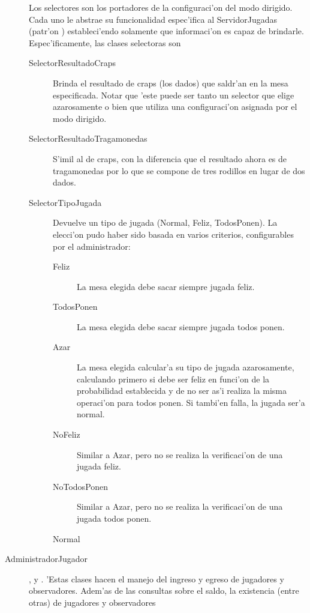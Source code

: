\begin{description}
\item[] Los selectores son los portadores de la configuraci'on del modo dirigido. Cada uno le abstrae su funcionalidad espec'ifica al ServidorJugadas (patr'on ) estableci'endo solamente que informaci'on es capaz de brindarle. Espec'ificamente, las clases selectoras son
	\begin{description}
	\item[SelectorResultadoCraps] Brinda el resultado de craps (los dados) que saldr'an en la mesa especificada. Notar que 'este puede ser tanto un selector que elige azarosamente o bien que utiliza una configuraci'on asignada por el modo dirigido.
	\item[SelectorResultadoTragamonedas] S'imil al de craps, con la diferencia que el resultado ahora es de tragamonedas por lo que se compone de tres rodillos en lugar de dos dados.
	\item[SelectorTipoJugada] Devuelve un tipo de jugada (Normal, Feliz, TodosPonen). La elecci'on pudo haber sido basada en varios criterios, configurables por el administrador:
		\begin{description}
			\item[Feliz] La mesa elegida debe sacar siempre jugada feliz.
			\item[TodosPonen] La mesa elegida debe sacar siempre jugada todos ponen.
			\item[Azar] La mesa elegida calcular'a su tipo de jugada azarosamente, calculando primero si debe ser feliz en funci'on de la probabilidad establecida y de no ser as'i realiza la misma operaci'on para todos ponen. Si tambi'en falla, la jugada ser'a normal.
			\item[NoFeliz] Similar a Azar, pero no se realiza la verificaci'on de una jugada feliz.
			\item[NoTodosPonen] Similar a Azar, pero no se realiza la verificaci'on de una jugada todos ponen.
			\item[Normal] 
		\end{description} 
	\end{description}














\item[AdministradorJugador],  y . 'Estas clases hacen el manejo del ingreso y egreso de jugadores y observadores. Adem'as de las consultas sobre el saldo, la existencia (entre otras) de jugadores y observadores


\end{description}
